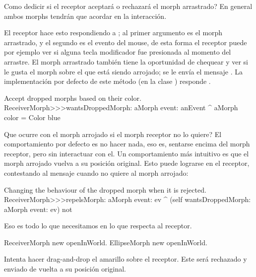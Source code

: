 \documentclass[a4paper,10pt,twoside]{book}
\begin{document}
Como dedicir si el receptor aceptar\'a o rechazar\'a el morph arrastrado?
En general ambos morphs tendr\'an que acordar en la interacci\'on.

El receptor hace esto respondiendo a ; al primer argumento es el morph arrastrado, y el segundo es el evento del mouse, de esta forma el receptor puede por ejemplo ver si alguna tecla modificador fue presionada al momento del arrastre.
El morph arrastrado tambi\'en tiene la oportunidad de chequear y ver si le gusta el morph sobre el que está siendo arrojado; se le env\'ia el mensaje . La implementaci\'on por defecto de este m\'etodo (en la clase ) responde .

\begin{method}{Accept dropped morphs based on their color.}
ReceiverMorph>>>wantsDroppedMorph: aMorph event: anEvent
	^ aMorph color = Color blue
\end{method}

Que ocurre con el morph arrojado si el morph receptor no lo quiere? El comportamiento por defecto es no hacer nada, eso es, sentarse encima del  morph receptor, pero sin interactuar con el. Un comportamiento m\'as intuitivo es que el morph arrojado vuelva a su posici\'on original. Esto puede lograrse en el receptor, contestando   al mensaje  cuando no quiere al morph arrojado:


\begin{method}{Changing the behaviour of the dropped morph when it is rejected.}
ReceiverMorph>>>repelsMorph: aMorph event: ev
	^ (self wantsDroppedMorph: aMorph event: ev) not
\end{method}

Eso es todo lo que necesitamos en lo que respecta al receptor.

\begin{code}{}
ReceiverMorph new openInWorld.
EllipseMorph new openInWorld.
\end{code}
\noindent
Intenta hacer drag-and-drop  el   amarillo sobre el receptor. Este ser\'a rechazado y enviado de vuelta a su posici\'on original.

\end{document}
